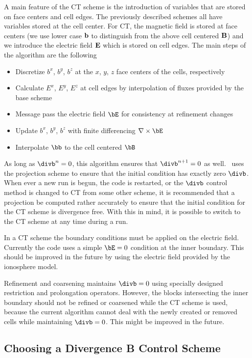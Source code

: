 A main feature of the CT scheme is the introduction of variables that
are stored on face centers and cell edges.  The previously described 
schemes all have  variables stored at the cell center.  For CT, the magnetic 
field is
stored at face centers (we use lower case $\bf b$ to distinguish from the
above cell centered $\bf B$) and we introduce the electric field $\bf E$
which is stored on cell edges.
The main steps of the algorithm are the following
\begin{itemize}\itemsep=0pt
\item Discretize $b^x$, $b^y$, $b^z$ at the $x$, $y$, $z$
             face centers of the cells, respectively
\item Calculate $E^x$, $E^y$, $E^z$ at cell edges by interpolation
      of fluxes provided by the base scheme
\item Message pass the electric field $\bE$ for consistency at refinement
      changes
\item Update $b^x$, $b^y$, $b^z$ with finite differencing $\nabla\times\bE$
\item Interpolate $\bb$ to the cell centered $\bB$
\end{itemize}

As long as $\divb^n=0$, this algorithm ensures that $\divb^{n+1}=0$ as well.
\BATSRUS\ uses the projection scheme to ensure that the initial condition
has exactly zero $\divb$. 
When ever a new run is begun, the code is restarted, or the $\divb$ control
method is changed to CT from some other scheme, it is recommended that 
a projection
be computed rather accurately to ensure that the initial condition for the CT
scheme is divergence free.  With this in mind, it is possible to switch to the 
CT scheme at any time during a run.

In a CT scheme the boundary conditions must be applied on the electric
field. Currently the code uses a simple $\bE=0$ condition at the inner
boundary. This should be improved in the future by using the electric
field provided by the ionosphere model.

Refinement and coarsening maintains $\divb=0$ using specially designed
restriction and prolongation operators. However, the blocks intersecting
the inner boundary should not be refined or coarsened while the CT scheme
is used, because the current algorithm cannot deal with the newly
created or removed cells while maintaining $\divb=0$. This might be
improved in the future.

\subsection{Choosing a Divergence B Control Scheme \label{section:choosing_divb_control}}

